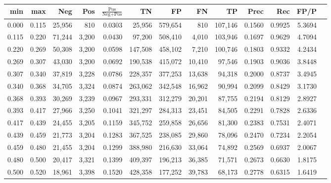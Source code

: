 \begin{tabular}{rrrrrrrrrrrrr}
\toprule
  min &   max &    Neg &   Pos & $\frac{\text{Pos}}{\text{Neg}+\text{Pos}}$ &      TN &      FP &      FN &      TP &   Prec &    Rec &   FP/P \\
\midrule
0.000 & 0.115 & 25,956 &   810 &                                     0.0303 &  25,956 & 579,654 &     810 & 107,146 & 0.1560 & 0.9925 & 5.3694 \\
0.115 & 0.220 & 71,244 & 3,200 &                                     0.0430 &  97,200 & 508,410 &   4,010 & 103,946 & 0.1697 & 0.9629 & 4.7094 \\
0.220 & 0.269 & 50,308 & 3,200 &                                     0.0598 & 147,508 & 458,102 &   7,210 & 100,746 & 0.1803 & 0.9332 & 4.2434 \\
0.269 & 0.307 & 43,030 & 3,200 &                                     0.0692 & 190,538 & 415,072 &  10,410 &  97,546 & 0.1903 & 0.9036 & 3.8448 \\
0.307 & 0.340 & 37,819 & 3,228 &                                     0.0786 & 228,357 & 377,253 &  13,638 &  94,318 & 0.2000 & 0.8737 & 3.4945 \\
0.340 & 0.368 & 34,705 & 3,324 &                                     0.0874 & 263,062 & 342,548 &  16,962 &  90,994 & 0.2099 & 0.8429 & 3.1730 \\
0.368 & 0.393 & 30,269 & 3,239 &                                     0.0967 & 293,331 & 312,279 &  20,201 &  87,755 & 0.2194 & 0.8129 & 2.8927 \\
0.393 & 0.417 & 27,966 & 3,250 &                                     0.1041 & 321,297 & 284,313 &  23,451 &  84,505 & 0.2291 & 0.7828 & 2.6336 \\
0.417 & 0.439 & 24,455 & 3,205 &                                     0.1159 & 345,752 & 259,858 &  26,656 &  81,300 & 0.2383 & 0.7531 & 2.4071 \\
0.439 & 0.459 & 21,773 & 3,204 &                                     0.1283 & 367,525 & 238,085 &  29,860 &  78,096 & 0.2470 & 0.7234 & 2.2054 \\
0.459 & 0.480 & 21,455 & 3,204 &                                     0.1299 & 388,980 & 216,630 &  33,064 &  74,892 & 0.2569 & 0.6937 & 2.0067 \\
0.480 & 0.500 & 20,417 & 3,321 &                                     0.1399 & 409,397 & 196,213 &  36,385 &  71,571 & 0.2673 & 0.6630 & 1.8175 \\
0.500 & 0.520 & 18,961 & 3,398 &                                     0.1520 & 428,358 & 177,252 &  39,783 &  68,173 & 0.2778 & 0.6315 & 1.6419 \\

\end{tabular}
